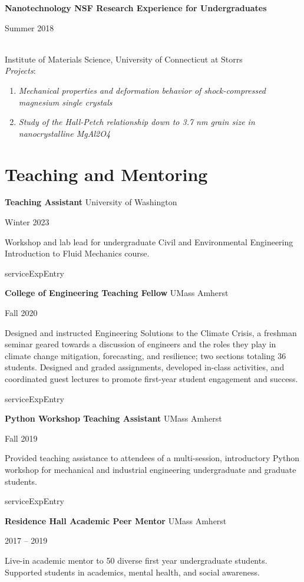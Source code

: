 \documentclass[letterpaper,11pt]{article}
\newenvironment{indentPar}[1]{
  \justifying
  \begin{list}{}{\setlength{\leftmargin}{#1}}%
  \item[]
}
{\end{list}}
\newcommand{\teachingExpEntry}[4]{
  \begin{minipage}[t]{.75\textwidth}
    \begin{flushleft}
      \textbf{#1}
      #2
    \end{flushleft}
  \end{minipage}
  \hfill
  \begin{minipage}[t]{.20\textwidth}
    \begin{flushright}
      #3%
    \end{flushright}
  \end{minipage}%
  \vspace{-7pt}
  \begin{indentPar}{0.5cm}
    #4%
  \end{indentPar}serviceExpEntry
}
\newcommand{\mentorshipExpEntry}[4]{
  \begin{minipage}[t]{.75\textwidth}
    \begin{flushleft}
      \textbf{#1}
      #2
    \end{flushleft}
  \end{minipage}
  \hfill
  \begin{minipage}[t]{.20\textwidth}
    \begin{flushright}
      #3%
    \end{flushright}
  \end{minipage}%
  \vspace{-7pt}
  \begin{indentPar}{0.5cm}
    #4%
  \end{indentPar}
}
\begin{document}
%
%
\begin{minipage}[t]{.70\textwidth}
    \flushleft
    \textbf{Nanotechnology NSF Research Experience for Undergraduates}\\
    \end{minipage}
    \hfill
    \begin{minipage}[t]{.20\textwidth}
    \flushright
    Summer 2018\\
\end{minipage} \\
Institute of Materials Science, University of Connecticut at Storrs\\

\textit{Projects}:
\vspace{-7pt}
     \begin{enumerate}
            \item \textit{Mechanical properties and deformation behavior of shock-compressed magnesium single crystals}
            \vspace{-7pt}
            \item \textit{Study of the Hall-Petch relationship down to 3.7 nm grain size in nanocrystalline MgAl2O4}
    \end{enumerate}
%

\break

\section{Teaching and Mentoring}

\teachingExpEntry
  {Teaching Assistant}{University of Washington}
  {Winter 2023}
  {Workshop and lab lead for undergraduate Civil and Environmental Engineering Introduction to Fluid Mechanics course.}
%
\teachingExpEntry
  {College of Engineering Teaching Fellow}{UMass Amherst}
  {Fall 2020}
  {Designed and instructed Engineering Solutions to the Climate Crisis, a freshman seminar geared towards a discussion of engineers and the roles they play in climate change mitigation, forecasting, and resilience; two sections totaling 36 students. Designed and graded assignments, developed in-class activities, and coordinated guest lectures to promote first-year student engagement and success.}
%
\teachingExpEntry
  {Python Workshop Teaching Assistant}{UMass Amherst}
  {Fall 2019}
  {Provided teaching assistance to attendees of a multi-session, introductory Python workshop for mechanical and industrial engineering undergraduate and graduate students.}
%
\mentorshipExpEntry
  {Residence Hall Academic Peer Mentor}{UMass Amherst}
  {2017 -- 2019}
  {Live-in academic mentor to 50 diverse first year undergraduate students. Supported students in academics, mental health, and social awareness.}
%
\end{document}
